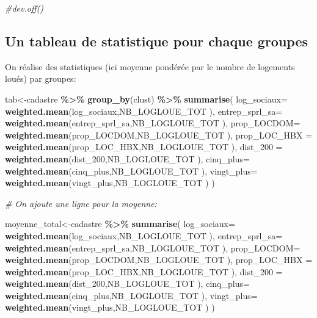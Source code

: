 \documentclass[
]{book}
\newenvironment{Shaded}{\begin{snugshade}}{\end{snugshade}}
\newcommand{\AttributeTok}[1]{\textcolor[rgb]{0.13,0.29,0.53}{#1}}
\newcommand{\CommentTok}[1]{\textcolor[rgb]{0.56,0.35,0.01}{\textit{#1}}}
\newcommand{\FunctionTok}[1]{\textcolor[rgb]{0.13,0.29,0.53}{\textbf{#1}}}
\newcommand{\NormalTok}[1]{#1}
\newcommand{\OtherTok}[1]{\textcolor[rgb]{0.56,0.35,0.01}{#1}}
\newcommand{\SpecialCharTok}[1]{\textcolor[rgb]{0.81,0.36,0.00}{\textbf{#1}}}
\begin{document}
\begin{Shaded}
\begin{Highlighting}[]
\CommentTok{\#dev.off()}
\end{Highlighting}
\end{Shaded}

\hypertarget{un-tableau-de-statistique-pour-chaque-groupes}{%
\subsection{Un tableau de statistique pour chaque groupes}\label{un-tableau-de-statistique-pour-chaque-groupes}}

On réalise des statistiques (ici moyenne pondérée par le nombre de logements loués) par groupes:

\begin{Shaded}
\begin{Highlighting}[]
\NormalTok{tab}\OtherTok{\textless{}{-}}\NormalTok{cadastre }\SpecialCharTok{\%\textgreater{}\%}
  \FunctionTok{group\_by}\NormalTok{(clust) }\SpecialCharTok{\%\textgreater{}\%}
  \FunctionTok{summarise}\NormalTok{(}
    \AttributeTok{log\_sociaux=} \FunctionTok{weighted.mean}\NormalTok{(log\_sociaux,NB\_LOGLOUE\_TOT ),}
    \AttributeTok{entrep\_sprl\_sa=} \FunctionTok{weighted.mean}\NormalTok{(entrep\_sprl\_sa,NB\_LOGLOUE\_TOT ),}
    \AttributeTok{prop\_LOCDOM=} \FunctionTok{weighted.mean}\NormalTok{(prop\_LOCDOM,NB\_LOGLOUE\_TOT ),}
    \AttributeTok{prop\_LOC\_HBX  =} \FunctionTok{weighted.mean}\NormalTok{(prop\_LOC\_HBX,NB\_LOGLOUE\_TOT ),}
    \AttributeTok{dist\_200 =} \FunctionTok{weighted.mean}\NormalTok{(dist\_200,NB\_LOGLOUE\_TOT ),}
    \AttributeTok{cinq\_plus=} \FunctionTok{weighted.mean}\NormalTok{(cinq\_plus,NB\_LOGLOUE\_TOT ),}
    \AttributeTok{vingt\_plus=} \FunctionTok{weighted.mean}\NormalTok{(vingt\_plus,NB\_LOGLOUE\_TOT ) )}


\CommentTok{\# On ajoute une ligne pour la moyenne:}

\NormalTok{moyenne\_total}\OtherTok{\textless{}{-}}\NormalTok{cadastre }\SpecialCharTok{\%\textgreater{}\%}
  \FunctionTok{summarise}\NormalTok{(}
    \AttributeTok{log\_sociaux=} \FunctionTok{weighted.mean}\NormalTok{(log\_sociaux,NB\_LOGLOUE\_TOT ),}
    \AttributeTok{entrep\_sprl\_sa=} \FunctionTok{weighted.mean}\NormalTok{(entrep\_sprl\_sa,NB\_LOGLOUE\_TOT ),}
    \AttributeTok{prop\_LOCDOM=} \FunctionTok{weighted.mean}\NormalTok{(prop\_LOCDOM,NB\_LOGLOUE\_TOT ),}
    \AttributeTok{prop\_LOC\_HBX  =} \FunctionTok{weighted.mean}\NormalTok{(prop\_LOC\_HBX,NB\_LOGLOUE\_TOT ),}
    \AttributeTok{dist\_200 =} \FunctionTok{weighted.mean}\NormalTok{(dist\_200,NB\_LOGLOUE\_TOT ),}
    \AttributeTok{cinq\_plus=} \FunctionTok{weighted.mean}\NormalTok{(cinq\_plus,NB\_LOGLOUE\_TOT ),}
    \AttributeTok{vingt\_plus=} \FunctionTok{weighted.mean}\NormalTok{(vingt\_plus,NB\_LOGLOUE\_TOT ) )}


\end{Highlighting}
\end{Shaded}
\end{document}
